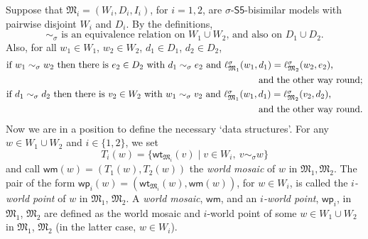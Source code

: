 \documentclass{lmcs} %
\theoremstyle{plain}\newtheorem{satz}[thm]{Satz} %
\newcommand{\FOMS}{\ensuremath{\mathsf{Q^1S5}}}
\newcommand{\wt}{\mathsf{wt}}
\newcommand{\wm}{\mathsf{wm}}
\newcommand{\iwp}{\mathsf{wp}_i}
\begin{document}
Suppose that $\mathfrak{M}_{i}= (W_i,D_i,I_i)$, for $i = 1,2$, are $\sigma$-$\mathsf{S5}$-bisimilar
models with pairwise disjoint $W_i$ and $D_i$.
By the definitions,
%
\begin{equation}\label{simequiv}
\mbox{$\sim_\sigma$ is an equivalence relation on $W_1\cup W_2$, and also on $D_1\cup D_2$.}
\end{equation}
%
Also, for all $w_1\in W_1$, $w_2\in W_2$, $d_1\in D_1$, $d_2\in D_2$,
%
\begin{align}
\nonumber
& \mbox{if $w_1\sim_\sigma w_2$ then there is $e_2\in D_2$ with
$d_1\sim_\sigma e_2$ and $\ell^\sigma_{\mathfrak M_1}(w_1,d_1) =\ell^\sigma_{\mathfrak M_2}(w_2,e_2)$,}\\
\label{simW}
& \hspace*{9.5cm}\mbox{and the other way round;}\\
\nonumber
& \mbox{if $d_1\sim_\sigma d_2$ then there is $v_2\in W_2$ with
$w_1\sim_\sigma v_2$ and $\ell^\sigma_{\mathfrak M_1}(w_1,d_1) =\ell^\sigma_{\mathfrak M_2}(
v_2,d_2)$,}\\
\label{simD}
& \hspace*{9.5cm}\mbox{and the other way round.}
\end{align}
%
Now we are in a position to define the necessary `data structures'. 
%
For any $w\in W_{1}\cup W_{2}$ and $i \in \{1,2\}$, we set
%
\begin{equation}\label{world-m}
T_{i}(w) = \{ \wt_{\mathfrak{M}_{i}}(v) \mid v \in W_{i}, \ v \sim_{\sigma} w\}
\end{equation}
%
and call $\wm(w) = (T_{1}(w),T_{2}(w))$ the \emph{world mosaic} of $w$ in $\mathfrak{M}_{1},\mathfrak{M}_{2}$. The pair of the form $\iwp(w) = (\wt_{\mathfrak{M}_{i}}(w),\wm(w))$, for $w\in W_{i}$, is called the \emph{$i$-world point} of $w$ in $\mathfrak{M}_{1}$, $\mathfrak{M}_{2}$. 
%
A \emph{world mosaic}, $\wm$, and an \emph{$i$-world point}, $\iwp$, in $\mathfrak{M}_{1}$, $\mathfrak{M}_{2}$ are defined as the world mosaic and $i$-world point of some $w\in W_{1} \cup W_2$ in $\mathfrak{M}_{1}$, $\mathfrak{M}_{2}$ (in the latter case, $w \in W_i$). 
\end{document}
